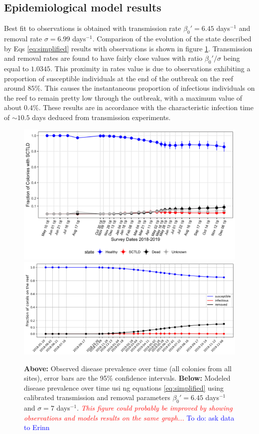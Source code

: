 \documentclass[utf8]{frontiersSCNS}
\newcommand{\emphc}[1]{\emph{\textcolor{red}{#1}}}
\begin{document}
\subsection{Epidemiological model results}

Best fit to observations is obtained with transmission rate $\beta_0'=6.45$ days$^{-1}$ and removal rate $\sigma=6.99$ days$^{-1}$. Comparison of the evolution of the state described by Eqs \ref{eq:simplified} results with observations is shown in figure \ref{fig:calibration}. Transmission and removal rates are found to have fairly close values with ratio $\beta_0'/\sigma$ being equal to $1.0345$. This proximity in rates value is due to observations exhibiting a proportion of susceptible individuals at the end of the outbreak on the reef around $85\%$. This causes the instantaneous proportion of infectious individuals on the reef to remain pretty low through the outbreak, with a maximum value of about $0.4\%$. These results are in accordance with the characteristic infection time of $\sim 10.5$ days deduced from transmission experiments.

\begin{figure}
    \centering
    \includegraphics[width=.7\textwidth]{figures/image2.png}
    \includegraphics[width=.69\textwidth]{figures/sir_obs.png}
    \caption{\textbf{Above:} Observed disease prevalence over time (all colonies from all sites), error bars are the 95\% confidence intervals. \textbf{Below:} Modeled disease prevalence over time usi ng equations \ref{eq:simplified} using calibrated transmission and removal parameters  $\beta_0'=6.45$ days$^{-1}$ and $\sigma=7$ days$^{-1}$. \emphc{This figure could probably be improved by showing observations and models results on the same graph...} \textcolor{blue}{To do: ask data to Erinn}}
    \label{fig:calibration}
\end{figure}
\end{document}
